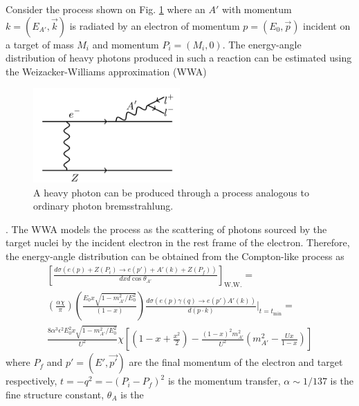 Consider the process shown on Fig. \ref{fig:ap_production} where an $A'$ with
momentum $k = (E_{A'}, \vec{k})$ is radiated by an electron of momentum 
$p = (E_0, \vec{p})$ incident on a target of mass $M_i$ and momentum 
$P_i = (M_i, 0)$. The energy-angle distribution of heavy photons produced in 
such a reaction can be estimated using the Weizacker-Williams approximation (WWA)
\begin{figure}[t]
    \centering
    \includegraphics[width=0.5\textwidth]{images/aprime_brem.png}
    \caption{A heavy photon can be produced through a process analogous to 
             ordinary photon bremsstrahlung.}
    \label{fig:ap_production}
\end{figure}  
\cite{Bjorken:2009mm, Tsai:1986tx}.  The WWA models the process as the 
scattering of photons sourced by the target nuclei by the incident electron
in the rest frame of the electron.  Therefore, the energy-angle distribution
can be obtained from the Compton-like process as
\begin{equation}
    \begin{split}
        \left[ \frac{d\sigma(e(p) + Z(P_i) \rightarrow e(p') + A'(k) + Z(P_f))}{dx d\cos\theta_{A'}} \right]_{\text{W.W.}} = \\
        \left( \frac{\alpha \chi}{\pi} \right) \left(\frac{E_0 x \sqrt{ 1 - m_{A'}^2/E_0^2}}{(1 - x)} \right) 
        \frac{d\sigma(e(p)\gamma(q) \rightarrow e(p') A'(k))}{d(p \cdot k)} |_{t = t_{\text{min}}} = \\
    \frac{8 \alpha^{3} \epsilon^{2} E_{0}^2 x \sqrt{1-m_{A'}^{2}/E_{0}^{2}}}{U^{2}} \chi
    \left [ \left (1 - x + \frac{x^{2}}{2} \right )  - \frac{(1-x)^{2} m_{A'}^{2}}{U^{2}}
    \left(m_{A'}^{2} - \frac{Ux}{1-x} \right) \right]
    \end{split}
    \label{eqn:ap_diff_cross}
\end{equation}
where $P_f$ and $p' = (E', \vec{p'})$ are the final momentum of the electron
and target respectively, $t = -q^2 = -(P_{i} - P_{f})^2$ is the momentum transfer, 
$\alpha \sim 1/137$ is the fine structure constant, $\theta_{A}$ is the
